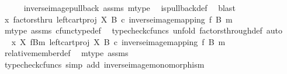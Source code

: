 \begin{isabellebody}
\ \ \ \ \isamarkupfalse%
\ inverse{\isacharunderscore}{\kern0pt}image{\isacharunderscore}{\kern0pt}pullback\ assms\ m{\isacharunderscore}{\kern0pt}type\ \isamarkupfalse%
\ is{\isacharunderscore}{\kern0pt}pullback{\isacharunderscore}{\kern0pt}def\ \isamarkupfalse%
\ blast\isanewline
\ \ \isamarkupfalse%
\ \isamarkupfalse%
\ {\isachardoublequoteopen}x\ factorsthru\ {\isacharparenleft}{\kern0pt}left{\isacharunderscore}{\kern0pt}cart{\isacharunderscore}{\kern0pt}proj\ X\ B\ {\isasymcirc}\isactrlsub c\ inverse{\isacharunderscore}{\kern0pt}image{\isacharunderscore}{\kern0pt}mapping\ f\ B\ m{\isacharparenright}{\kern0pt}{\isachardoublequoteclose}\isanewline
\ \ \ \ \isamarkupfalse%
\ m{\isacharunderscore}{\kern0pt}type\ assms\ cfunc{\isacharunderscore}{\kern0pt}type{\isacharunderscore}{\kern0pt}def\ \isamarkupfalse%
\ {\isacharparenleft}{\kern0pt}typecheck{\isacharunderscore}{\kern0pt}cfuncs{\isacharcomma}{\kern0pt}\ unfold\ factors{\isacharunderscore}{\kern0pt}through{\isacharunderscore}{\kern0pt}def{\isacharcomma}{\kern0pt}\ auto{\isacharparenright}{\kern0pt}\isanewline
\ \ \isamarkupfalse%
\ \isamarkupfalse%
\ {\isachardoublequoteopen}x\ {\isasymin}\isactrlbsub X\isactrlesub \ {\isacharparenleft}{\kern0pt}f\isactrlsup {\isacharminus}{\kern0pt}B{\isasymrparr}\isactrlbsub m\isactrlesub {\isacharcomma}{\kern0pt}\ left{\isacharunderscore}{\kern0pt}cart{\isacharunderscore}{\kern0pt}proj\ X\ B\ {\isasymcirc}\isactrlsub c\ inverse{\isacharunderscore}{\kern0pt}image{\isacharunderscore}{\kern0pt}mapping\ f\ B\ m{\isacharparenright}{\kern0pt}{\isachardoublequoteclose}\isanewline
\ \ \ \ \isamarkupfalse%
\ relative{\isacharunderscore}{\kern0pt}member{\isacharunderscore}{\kern0pt}def{}\ \isamarkupfalse%
\ m{\isacharunderscore}{\kern0pt}type\ assms\isanewline
\ \ \ \ \isamarkupfalse%
\ {\isacharparenleft}{\kern0pt}typecheck{\isacharunderscore}{\kern0pt}cfuncs{\isacharcomma}{\kern0pt}\ simp\ add{\isacharcolon}{\kern0pt}\ inverse{\isacharunderscore}{\kern0pt}image{\isacharunderscore}{\kern0pt}monomorphism{\isacharparenright}{\kern0pt}\isanewline
{}\isamarkupfalse%
%
\endisatagproof
{\isafoldproof}%
%
\isadelimproof
%
\endisadelimproof
%
\isadelimdocument
%
\endisadelimdocument
%
\isatagdocument
%
\isamarkuptrue%
%
\endisatagdocument
{\isafolddocument}%
%
\isadelimdocument

\end{isabellebody}
